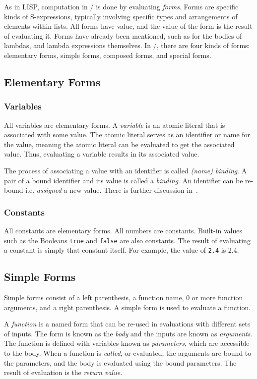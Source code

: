 As in LISP, computation in \lispy/ is done by evaluating \textit{forms}. Forms are specific kinds of S-expressions, typically involving specific types and arrangements of elements within lists. All forms have value, and the value of the form is the result of evaluating it. Forms have already been mentioned, such as for the bodies of lambdas, and lambda expressions themselves. In \lispy/, there are four kinds of forms: elementary forms, simple forms, composed forms, and special forms.

\subsection{Elementary Forms}
\subsubsection{Variables}
All variables are elementary forms. A \textit{variable} is an atomic literal that is associated with some value. The atomic literal serves as an identifier or name for the value, meaning the atomic literal can be evaluated to get the associated value. Thus, evaluating a variable results in its associated value.

The process of associating a value with an identifier is called \textit{(name) binding}. A pair of a bound identifier and its value is called a \textit{binding}. An identifier can be re-bound i.e. \textit{assigned} a new value. There is further discussion in~.

\subsubsection{Constants}
All constants are elementary forms. All numbers are constants. Built-in values such as the Booleans \texttt{true} and \texttt{false} are also constants. The result of evaluating a constant is simply that constant itself. For example, the value of \texttt{2.4} is 2.4.

\subsection{Simple Forms}\label{subsec:simpleforms}
Simple forms consist of a left parenthesis, a function name, 0 or more function arguments, and a right parenthesis. A simple form is used to evaluate a function.

A \textit{function} is a named form that can be re-used in evaluations with different sets of inputs. The form is known as the \textit{body} and the inputs are known as \textit{arguments}. The function is defined with variables known as \textit{parameters}, which are accessible to the body. When a function is \textit{called}, or evaluated, the arguments are bound to the parameters, and the body is evaluated using the bound parameters. The result of evaluation is the \textit{return value}.

